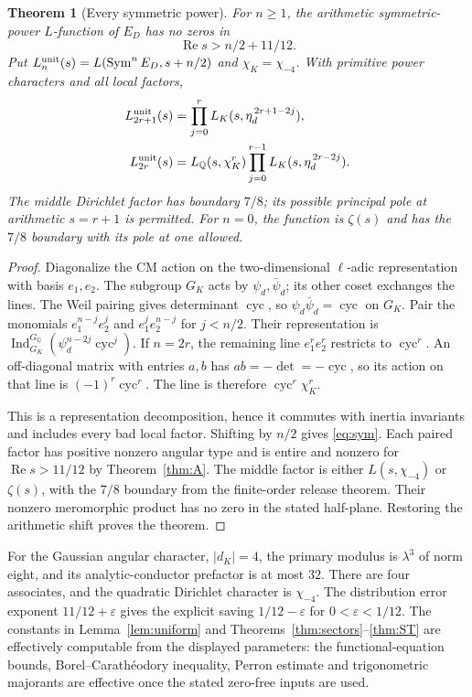 \documentclass[11pt,a4paper]{article}
\numberwithin{equation}{section}
\newtheorem{theorem}{Theorem}[section]
\theoremstyle{definition}
\theoremstyle{remark}
\newcommand{\Q}{\mathbb Q}
\newcommand{\Rea}{\operatorname{Re}}
\newcommand{\eps}{\varepsilon}
\begin{document}
\begin{theorem}[Every symmetric power]\label{thm:sym}
For $n\ge1$, the arithmetic symmetric-power $L$-function of $E_D$ has no zeros in
\[
 \Rea s>n/2+11/12.
\]
Put $L_n^{\rm unit}(s)=L(\operatorname{Sym}^n E_D,s+n/2)$ and $\chi_K=\chi_{-4}$. With primitive power characters and all local factors,
\begin{align}\label{eq:sym}
 L_{2r+1}^{\rm unit}(s)&=\prod_{j=0}^rL_K(s,\eta_d^{\,2r+1-2j}),\notag\\
 L_{2r}^{\rm unit}(s)&=L_\Q(s,\chi_K^r)
                         \prod_{j=0}^{r-1}L_K(s,\eta_d^{\,2r-2j}).
\end{align}
The middle Dirichlet factor has boundary $7/8$; its possible principal pole at arithmetic $s=r+1$ is permitted.
For $n=0$, the function is $\zeta(s)$ and has the $7/8$ boundary with its pole at one allowed.
\end{theorem}
\begin{proof}
Diagonalize the CM action on the two-dimensional $\ell$-adic representation with basis $e_1,e_2$. The subgroup $G_K$ acts by $\psi_d,\bar\psi_d$; its other coset exchanges the lines. The Weil pairing gives determinant $\operatorname{cyc}$, so $\psi_d\bar\psi_d=\operatorname{cyc}$ on $G_K$. Pair the monomials $e_1^{n-j}e_2^j$ and $e_1^je_2^{n-j}$ for $j<n/2$. Their representation is
$\operatorname{Ind}_{G_K}^{G_\Q}(\psi_d^{n-2j}\operatorname{cyc}^j)$.
If $n=2r$, the remaining line $e_1^re_2^r$ restricts to $\operatorname{cyc}^r$. An off-diagonal matrix with entries $a,b$ has $ab=-\det=-\operatorname{cyc}$, so its action on that line is
$(-1)^r\operatorname{cyc}^r$. The line is therefore
$\operatorname{cyc}^r\chi_K^r$.

This is a representation decomposition, hence it commutes with inertia invariants and includes every bad local factor. Shifting by $n/2$ gives \eqref{eq:sym}. Each paired factor has positive nonzero angular type and is entire and nonzero for $\Rea s>11/12$ by Theorem~\ref{thm:A}. The middle factor is either $L(s,\chi_{-4})$ or $\zeta(s)$, with the $7/8$ boundary from the finite-order release theorem. Their nonzero meromorphic product has no zero in the stated half-plane. Restoring the arithmetic shift proves the theorem.
\end{proof}

For the Gaussian angular character, $|d_K|=4$, the primary modulus is $\lambda^3$ of norm eight, and its analytic-conductor prefactor is at most $32$. There are four associates, and the quadratic Dirichlet character is $\chi_{-4}$. The distribution error exponent $11/12+\eps$ gives the explicit saving $1/12-\eps$ for $0<\eps<1/12$. The constants in Lemma~\ref{lem:uniform} and Theorems~\ref{thm:sectors}--\ref{thm:ST} are effectively computable from the displayed parameters: the functional-equation bounds, Borel--Carath\'eodory inequality, Perron estimate and trigonometric majorants are effective once the stated zero-free inputs are used.
\end{document}
